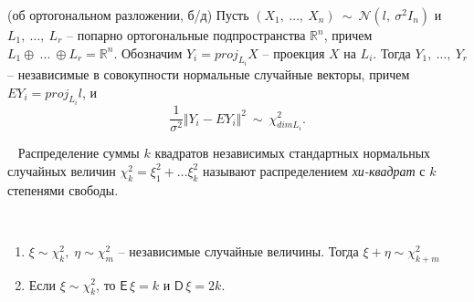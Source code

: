 
\begin{theorem} \label{ort}
    (об ортогональном разложении, б/д) Пусть $\displaystyle ( X_{1} ,\ \dotsc ,\ X_{n}) \ \sim \ \mathcal{N}\left( l,\ \sigma ^{2} I_{n}\right)$ и $\displaystyle L_{1} ,\ \dotsc ,\ L_{r}$ -- попарно ортогональные подпространства $\displaystyle \mathbb{R}^{n}$, причем $\displaystyle L_{1} \oplus \ \dotsc \ \oplus L_{r} =\mathbb{R}^{n}$. Обозначим $\displaystyle Y_{i} =proj_{L_{i}} X$ -- проекция $\displaystyle X$ на $\displaystyle L_{i}$. Тогда $\displaystyle Y_{1} ,\ \dotsc ,\ Y_{r}$ -- независимые в совокупности нормальные случайные векторы, причем $\displaystyle EY_{i} =proj_{L_{i}} l$, и
    \begin{equation*}
        \dfrac{1}{\sigma ^{2}}\Vert Y_{i} -EY_{i}\Vert ^{2} \ \sim \ \chi _{dimL_{i}}^{2} .
    \end{equation*}
\end{theorem}

\begin{definition} ~
    Распределение суммы $k$ квадратов независимых стандартных нормальных случайных величин ${\chi}_k^{2} = \xi_1^2 + \ldots \xi_k^2$ называют распределением \textit{хи-квадрат} с $k$ степенями свободы.
\end{definition}

\begin{proposition} ~
    \begin{enumerate}
        \item $\displaystyle \xi \sim \chi_k^2, \; \eta \sim \chi_m^2$ -- независимые случайные величины. Тогда $ \xi + \eta \sim \chi_{k+m}^2$
        
        \item Если $\xi \sim \chi^2_k$, то $
{\mathsf E}\,\xi=k$ и ${\mathsf D}\,\xi=2k.$
    \end{enumerate}
\end{proposition}


